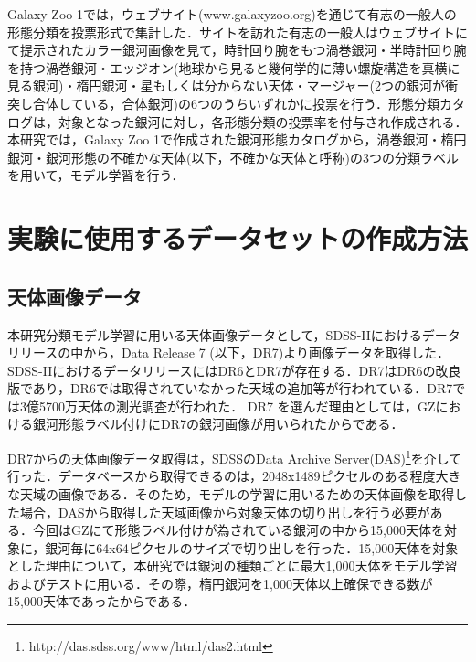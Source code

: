 \documentclass[a4j, 11pt]{jreport}
\begin{document}
Galaxy Zoo 1では，ウェブサイト(www.galaxyzoo.org)を通じて有志の一般人の形態分類を投票形式で集計した．サイトを訪れた有志の一般人はウェブサイトにて提示されたカラー銀河画像を見て，時計回り腕をもつ渦巻銀河・半時計回り腕を持つ渦巻銀河・エッジオン(地球から見ると幾何学的に薄い螺旋構造を真横に見る銀河)・楕円銀河・星もしくは分からない天体・マージャー(2つの銀河が衝突し合体している，合体銀河)の6つのうちいずれかに投票を行う．形態分類カタログは，対象となった銀河に対し，各形態分類の投票率を付与され作成される．本研究では，Galaxy Zoo 1で作成された銀河形態カタログから，渦巻銀河・楕円銀河・銀河形態の不確かな天体(以下，不確かな天体と呼称)の3つの分類ラベルを用いて，モデル学習を行う．




\section{実験に使用するデータセットの作成方法}
\subsection{天体画像データ}
本研究分類モデル学習に用いる天体画像データとして，SDSS-IIにおけるデータリリースの中から，Data Release 7 (以下，DR7)\cite{Abazajian2009}より画像データを取得した．SDSS-IIにおけるデータリリースにはDR6とDR7が存在する．DR7はDR6の改良版であり，DR6では取得されていなかった天域の追加等が行われている．DR7では3億5700万天体の測光調査が行われた．
DR7 を選んだ理由としては，GZにおける銀河形態ラベル付けにDR7の銀河画像が用いられたからである．

DR7からの天体画像データ取得は，SDSSのData Archive Server(DAS)\footnote{http://das.sdss.org/www/html/das2.html}を介して行った．データベースから取得できるのは，2048x1489ピクセルのある程度大きな天域の画像である．そのため，モデルの学習に用いるための天体画像を取得した場合，DASから取得した天域画像から対象天体の切り出しを行う必要がある．今回はGZにて形態ラベル付けが為されている銀河の中から15,000天体を対象に，銀河毎に64x64ピクセルのサイズで切り出しを行った．15,000天体を対象とした理由について，本研究では銀河の種類ごとに最大1,000天体をモデル学習およびテストに用いる．その際，楕円銀河を1,000天体以上確保できる数が15,000天体であったからである．
\end{document}
